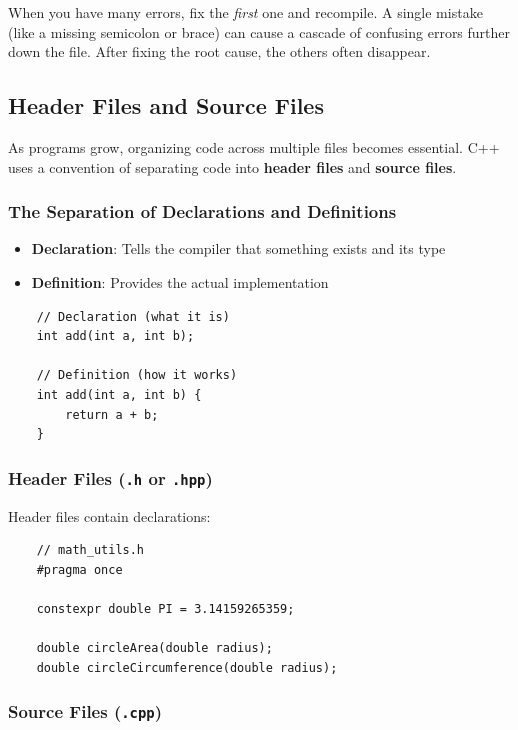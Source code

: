 \begin{remark}
	When you have many errors, fix the \textit{first} one and recompile. A single mistake (like a missing semicolon or brace) can cause a cascade of confusing errors further down the file. After fixing the root cause, the others often disappear.
\end{remark}

\subsection{Header Files and Source Files}

As programs grow, organizing code across multiple files becomes essential. C++ uses a convention of separating code into \textbf{header files} and \textbf{source files}.

\subsubsection{The Separation of Declarations and Definitions}

\begin{itemize}
	\item \textbf{Declaration}: Tells the compiler that something exists and its type
	\item \textbf{Definition}: Provides the actual implementation
\end{itemize}

\begin{lstlisting}
	// Declaration (what it is)
	int add(int a, int b);
	
	// Definition (how it works)
	int add(int a, int b) {
		return a + b;
	}
\end{lstlisting}

\subsubsection{Header Files (\texttt{.h} or \texttt{.hpp})}

Header files contain declarations:

\begin{lstlisting}
	// math_utils.h
	#pragma once
	
	constexpr double PI = 3.14159265359;
	
	double circleArea(double radius);
	double circleCircumference(double radius);
\end{lstlisting}

\subsubsection{Source Files (\texttt{.cpp})}

